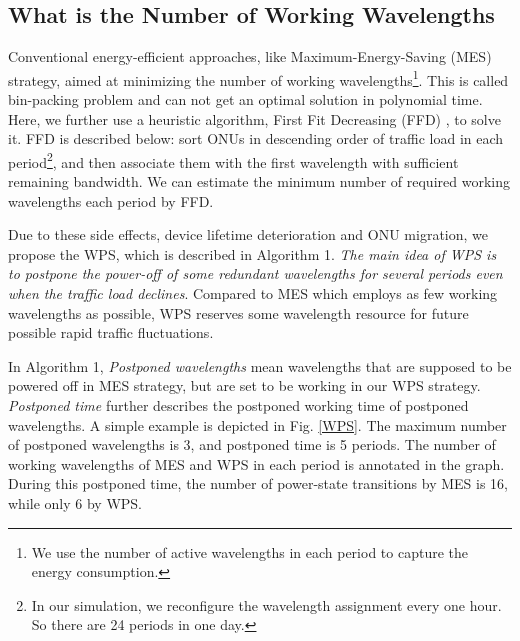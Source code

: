 \documentclass[letter]{IEEEtran}
\begin{document}
\subsection{What is the Number of Working Wavelengths}
Conventional energy-efficient approaches, like Maximum-Energy-Saving (MES) strategy, aimed at minimizing the number of working wavelengths\footnote{We use the number of active wavelengths in each period to capture the energy consumption.}. This is called bin-packing problem and can not get an optimal solution in polynomial time. Here, we further use a heuristic algorithm, First Fit Decreasing (FFD) \cite{baker1985new}, to solve it. FFD is described below: sort ONUs in descending order of traffic load in each period\footnote{In our simulation, we reconfigure the wavelength assignment every one hour. So there are 24 periods in one day.}, and then associate them with the first wavelength with sufficient remaining bandwidth. We can estimate the minimum number of required working wavelengths each period by FFD.

Due to these side effects, device lifetime deterioration and ONU migration, we propose the WPS, which is described in Algorithm 1. \emph{The main idea of WPS is to postpone the power-off of some redundant wavelengths for several periods even when the traffic load declines}. Compared to MES which employs as few working wavelengths as possible, WPS reserves some wavelength resource for future possible rapid traffic fluctuations. 

In Algorithm 1, \emph{Postponed wavelengths} mean wavelengths that are supposed to be powered off in MES strategy, but are set to be working in our WPS strategy. \emph{Postponed time} further describes the postponed working time of postponed wavelengths. A simple example is depicted in Fig. \ref{WPS}. The maximum number of postponed wavelengths is 3, and postponed time is 5 periods. The number of working wavelengths of MES and WPS in each period is annotated in the graph. During this postponed time, the number of power-state transitions by MES is 16, while only 6 by WPS. 
\end{document}
